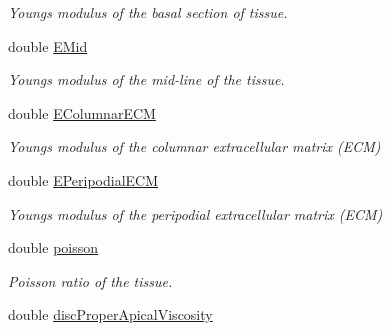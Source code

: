 \begin{DoxyCompactItemize}
\begin{DoxyCompactList}\small\item\em Young\textquotesingle{}s modulus of the basal section of tissue. \end{DoxyCompactList}\item 
\hypertarget{classSimulation_a7241e19c4db7e819dad00bf210e8ca46}{}double \hyperlink{classSimulation_a7241e19c4db7e819dad00bf210e8ca46}{E\+Mid}\label{classSimulation_a7241e19c4db7e819dad00bf210e8ca46}

\begin{DoxyCompactList}\small\item\em Young\textquotesingle{}s modulus of the mid-\/line of the tissue. \end{DoxyCompactList}\item 
\hypertarget{classSimulation_a82219fd675e3f94e3de603f01af32dd9}{}double \hyperlink{classSimulation_a82219fd675e3f94e3de603f01af32dd9}{E\+Columnar\+E\+C\+M}\label{classSimulation_a82219fd675e3f94e3de603f01af32dd9}

\begin{DoxyCompactList}\small\item\em Young\textquotesingle{}s modulus of the columnar extracellular matrix (E\+C\+M) \end{DoxyCompactList}\item 
\hypertarget{classSimulation_a66bc1ebb86876dd826aee17cd78764f2}{}double \hyperlink{classSimulation_a66bc1ebb86876dd826aee17cd78764f2}{E\+Peripodial\+E\+C\+M}\label{classSimulation_a66bc1ebb86876dd826aee17cd78764f2}

\begin{DoxyCompactList}\small\item\em Young\textquotesingle{}s modulus of the peripodial extracellular matrix (E\+C\+M) \end{DoxyCompactList}\item 
\hypertarget{classSimulation_a49bdb9254f7b7f5a6e33352c43881422}{}double \hyperlink{classSimulation_a49bdb9254f7b7f5a6e33352c43881422}{poisson}\label{classSimulation_a49bdb9254f7b7f5a6e33352c43881422}

\begin{DoxyCompactList}\small\item\em Poisson ratio of the tissue. \end{DoxyCompactList}\item 
\hypertarget{classSimulation_a6db999f14bd36d808d133eb9ae702f9a}{}double \hyperlink{classSimulation_a6db999f14bd36d808d133eb9ae702f9a}{disc\+Proper\+Apical\+Viscosity}\label{classSimulation_a6db999f14bd36d808d133eb9ae702f9a}


\end{DoxyCompactItemize}
